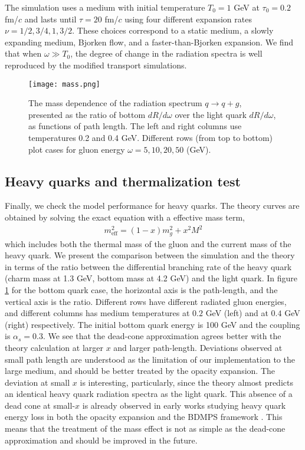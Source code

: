 The simulation uses a medium with initial temperature $T_0=1$ GeV at $\tau_0=0.2$ fm/$c$ and lasts until $\tau = 20$ fm/$c$ using four different expansion rates $\nu = 1/2, 3/4, 1, 3/2$.
These choices correspond to a static medium, a slowly expanding medium, Bjorken flow, and a faster-than-Bjorken expansion.
We find that when $\omega \gg T_0$, the degree of change in the radiation spectra is well reproduced by the modified transport simulations.

\begin{figure}
\singlespacing
\texttt{[image: mass.png]}
\caption[The mass dependence of the radiation spectrum $q\rightarrow q+g$,]{The mass dependence of the radiation spectrum $q\rightarrow q+g$, presented as the ratio of bottom $dR/d\omega$ over the light quark $dR/d\omega$, as functions of path length. The left and right columns use temperatures 0.2 and 0.4 GeV. Different rows (from top to bottom) plot cases for gluon energy $\omega = 5, 10, 20, 50$ (GeV).}
\label{fig:mass}
\end{figure}

\subsection{Heavy quarks and thermalization test}
Finally, we check the model performance for heavy quarks.
The theory curves are obtained by solving the exact equation with a effective mass term,
\begin{eqnarray}
m_{\textrm{eff}}^2 = (1-x)m_g^2 + x^2 M^2
\end{eqnarray}
which includes both the thermal mass of the gluon and the current mass of the heavy quark.
We present the comparison between the simulation and the theory in terms of the ratio between the differential branching rate of the heavy quark (charm mass at 1.3 GeV, bottom mass at 4.2 GeV) and the light quark.
In figure \ref{fig:mass} for the bottom quark case, the horizontal axis is the path-length, and the vertical axis is the ratio.
Different rows have different radiated gluon energies, and different  columns has medium temperatures at $0.2$ GeV (left) and at $0.4$ GeV (right) respectively.
The initial bottom quark energy is 100 GeV and the coupling is $\alpha_s=0.3$.
We see that the dead-cone approximation agrees better with the theory calculation at larger $x$ and larger path-length.
Deviations observed at small path length are understood as the limitation of our implementation to the large medium, and should be better treated by the opacity expansion. 
The deviation at small $x$ is interesting, particularly, since the theory almost predicts an identical heavy quark radiation spectra as the light quark. 
This absence of a dead cone at small-$x$ is already observed in early works studying heavy quark energy loss in both the opacity expansion and the BDMPS framework \cite{Armesto:2003jh}.
This means that the treatment of the mass effect is not as simple as the dead-cone approximation and should be improved in the future.

